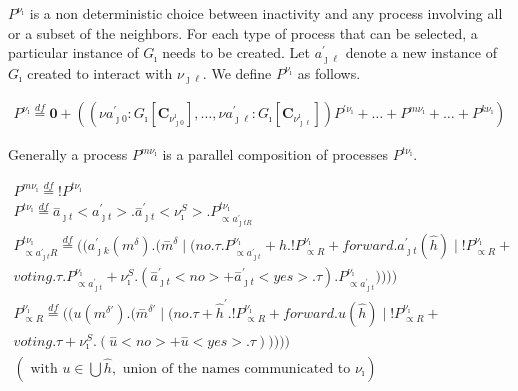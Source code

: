 $P^{\nu_\imath}$ is a non deterministic choice between inactivity and any process involving all or a subset of the
neighbors. For each type of process that can be selected, a particular instance of $G_\imath$ needs to be created. Let
$a^\prime_{\jmath\ell}$ denote a new instance of $G_\imath$ created to interact with $\nu_{\jmath\ell}$. We define
$P^{\nu_\imath}$ as follows.

\begin{equation} 
	\label{eq:pviexpr1}
	\begin{gathered} 
		P^{\nu_\imath} \overset{df}{=} \mathbf{0} + ((\nu a^\prime_{\jmath 0}:G_\imath[\mathbf{C}_{\nu^\imath_{\jmath 0}}], \ldots, \nu a^\prime_{\jmath\ell}:G_\imath[\mathbf{C}_{\nu^\imath_{\jmath\ell}}]) P^{\prime\nu_\imath} + \ldots + P^{m\nu_\imath} + \ldots + P^{k\nu_\imath})
	\end{gathered}
\end{equation}

Generally a process $P^{m\nu_\imath}$ is a parallel composition of processes $P^{t\nu_\imath}$.

\begin{equation} 
	\label{eq:pviexpr11}
	\begin{gathered} 
		P^{m\nu_\imath}\overset{df}{=}!P^{t\nu_\imath}\\
		P^{t\nu_\imath}\overset{df}{=}\overset{-}{a}_{\jmath t}<a^\prime_{\jmath t}>.\overset{-}{a}^\prime_{\jmath t}<\nu^S_\imath>.P^{t\nu_\imath}_{\propto a^\prime_{\jmath tR}}\\
		P^{t\nu_\imath}_{\propto a^\prime_{\jmath t}R}\overset{df}{=}((a^\prime_{\jmath k}(m^\delta).(\overset{-}{m}^\delta\mid (no.\tau.P^{\nu_\imath}_{\propto a^\prime_{\jmath t}} + \hat{h}.!P^{\nu_\imath}_{\propto R} + forward.a^\prime_{\jmath t}(\hat{h})\mid !P^{\nu_\imath}_{\propto R} +\\ voting.\tau.P^{\nu_\imath}_{\propto a^\prime_{\jmath t}} + \nu_\imath^S.(\overset{-}{a}^\prime_{\jmath t}<no> + \overset{-}{a}^\prime_{\jmath t}<yes>.\tau).P^{\nu_\imath}_{\propto a^\prime_{\jmath t}}))))\\
		P^{\nu_\imath}_{\propto R}\overset{df}{=}((u(m^{\delta\prime}).(\overset{-}{m}^{\delta\prime}\mid (no.\tau + \hat{h}^\prime.!P^{\nu_\imath}_{\propto R} + forward.u(\hat{h})\mid !P^{\nu_\imath}_{\propto R} +\\ voting.\tau + \nu_\imath^S.(\overset{-}{u}<no> + \overset{-}{u}<yes>.\tau)))))\\ (\mbox{ with } u\in\bigcup\hat{h}, \mbox{ union of the names communicated to } \nu_\imath)
	\end{gathered}
\end{equation}

